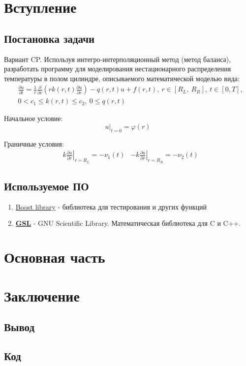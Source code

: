 \documentclass[a4paper,12pt]{article}
\begin{document}
	
	\newpage
	\tableofcontents
	\newpage

	\section{Вступление}
	\subsection{Постановка задачи}

	Вариант CP. Используя интегро-интерполяционный метод (метод баланса), разработать программу для моделирования нестационарного распределения температуры в полом цилиндре, описываемого математической моделью вида:
	\begin{align*}
		&\frac{\partial u}{\partial t} = \frac{1}{r} \frac{\partial}{\partial r}
		\left ( rk(r, t)\frac{\partial u}{\partial r} \right ) - q(r, t)u + f(r,t),
		\ r \in \left[ R_L,\ R_R\right],\ t \in [0, T],
		\\
		&0 < c_1 \leq k(r, t) \leq c_2,\ 0 \leq q(r, t)
	\end{align*}

	Начальное условие:
	\[
		\left. u \right\vert_{t=0} = \varphi(r)
	\]

	Граничные условия: \newline
	\begin{align*}
		&k \left. \frac{\partial u}{\partial r}\right\vert_{r = R_L} = -\nu_1(t)
		&-k \left. \frac{\partial u}{\partial r}\right\vert_{r = R_R} = -\nu_2(t)
	\end{align*}
	\subsection{Используемое ПО}

	\begin{enumerate}
		\item \href{https://www.boost.org/}{Boost library} - библиотека для тестирования и других функций
		\item \href{https://www.gnu.org/software/gsl/}{\textbf{GSL}} - GNU Scientific Library. Математическая библиотека для C и C++.
	\end{enumerate}
	\newpage

	\section{Основная часть}
	
	

	\newpage

	\section{Заключение}
	\subsection{Вывод}
	\newpage
	\subsection{Код}
\end{document}
